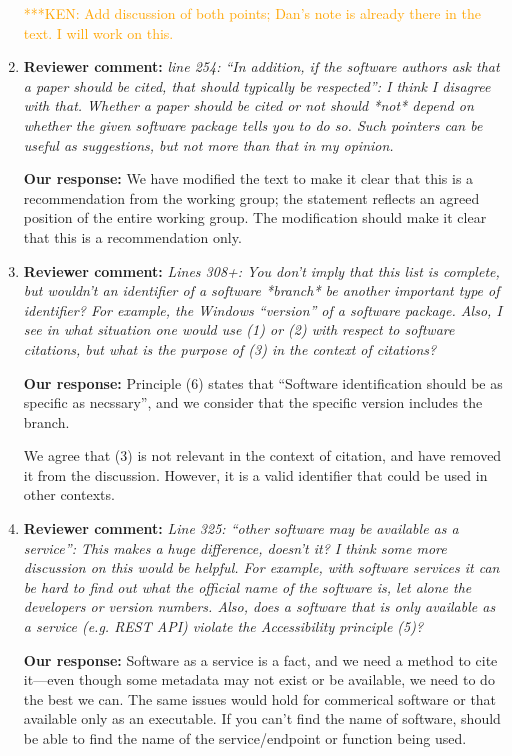\documentclass{article}
\newcommand{\niemnote}[1]{ {\textcolor{orange} { ***KEN: #1 }}} %
\begin{document}
\begin{enumerate}
\niemnote{Add discussion of both points; Dan's note is already there in the text. I will work on this.}

\item \textbf{Reviewer comment:}
\emph{line 254: ``In addition, if the software authors ask that a paper should be cited, that should typically be respected'': I think I disagree with that. Whether a paper should be cited or not should *not* depend on whether the given software package tells you to do so. Such pointers can be useful as suggestions, but not more than that in my opinion.}

\textbf{Our response:}
We have modified the text to make it clear that this is a recommendation from the working group; the statement reflects an agreed position of the entire working group. The modification should make it clear that this is a recommendation only.

\item \textbf{Reviewer comment:}
\emph{Lines 308+: You don't imply that this list is complete, but wouldn't an identifier of a software *branch* be another important type of identifier? For example, the Windows ``version'' of a software package. Also, I see in what situation one would use (1) or (2) with respect to software citations, but what is the purpose of (3) in the context of citations?}

\textbf{Our response:}
Principle (6) states that ``Software identification should be as specific as necssary'', and we consider that the specific version includes the branch.

We agree that (3) is not relevant in the context of citation, and have removed it from the discussion.
However, it is a valid identifier that could be used in other contexts.

\item \textbf{Reviewer comment:}
\emph{Line 325: ``other software may be available as a service'': This makes a huge difference, doesn't it? I think some more discussion on this would be helpful. For example, with software services it can be hard to find out what the official name of the software is, let alone the developers or version numbers. Also, does a software that is only available as a service (e.g. REST API) violate the Accessibility principle (5)?}

\textbf{Our response:}
Software as a service is a fact, and we need a method to cite it---even though some metadata may not exist or be available, we need to do the best we can.
The same issues would hold for commerical software or that available only as an executable.
If you can't find the name of software, should be able to find the name of the service\slash endpoint or function being used.


\end{enumerate}
\end{document}
